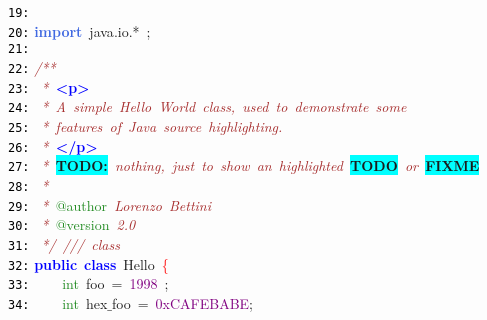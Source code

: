 \documentclass{article}
\begin{document}
\mbox{}\texttt{\textcolor{Black}{19:}}  \\
\mbox{}\texttt{\textcolor{Black}{20:}} \textbf{\textcolor{RoyalBlue}{import}}\ java\textcolor{BrickRed}{.}io\textcolor{BrickRed}{.*}\ \textcolor{BrickRed}{;} \\
\mbox{}\texttt{\textcolor{Black}{21:}}  \\
\mbox{}\texttt{\textcolor{Black}{22:}} \textit{\textcolor{Brown}{/**}} \\
\mbox{}\texttt{\textcolor{Black}{23:}} \textit{\textcolor{Brown}{\ *\ }}\textbf{\textcolor{Blue}{\textless{}p\textgreater{}}} \\
\mbox{}\texttt{\textcolor{Black}{24:}} \textit{\textcolor{Brown}{\ *\ A\ simple\ Hello\ World\ class,\ used\ to\ demonstrate\ some}} \\
\mbox{}\texttt{\textcolor{Black}{25:}} \textit{\textcolor{Brown}{\ *\ features\ of\ Java\ source\ highlighting.}} \\
\mbox{}\texttt{\textcolor{Black}{26:}} \textit{\textcolor{Brown}{\ *\ }}\textbf{\textcolor{Blue}{\textless{}/p\textgreater{}}} \\
\mbox{}\texttt{\textcolor{Black}{27:}} \textit{\textcolor{Brown}{\ *\ }}\textbf{\colorbox{Cyan}{TODO:}}\textit{\textcolor{Brown}{\ nothing,\ just\ to\ show\ an\ highlighted\ }}\textbf{\colorbox{Cyan}{TODO}}\textit{\textcolor{Brown}{\ or\ }}\textbf{\colorbox{Cyan}{FIXME}} \\
\mbox{}\texttt{\textcolor{Black}{28:}} \textit{\textcolor{Brown}{\ *}} \\
\mbox{}\texttt{\textcolor{Black}{29:}} \textit{\textcolor{Brown}{\ *\ }}\textcolor{ForestGreen}{@author}\textit{\textcolor{Brown}{\ Lorenzo\ Bettini}} \\
\mbox{}\texttt{\textcolor{Black}{30:}} \textit{\textcolor{Brown}{\ *\ }}\textcolor{ForestGreen}{@version}\textit{\textcolor{Brown}{\ 2.0}} \\
\mbox{}\texttt{\textcolor{Black}{31:}} \textit{\textcolor{Brown}{\ */}}\ \textit{\textcolor{Brown}{///\ class}} \\
\mbox{}\texttt{\textcolor{Black}{32:}} \textbf{\textcolor{Blue}{public}}\ \textbf{\textcolor{Blue}{class}}\ \textcolor{TealBlue}{Hello}\ \textcolor{Red}{\{} \\
\mbox{}\texttt{\textcolor{Black}{33:}} \ \ \ \ \textcolor{ForestGreen}{int}\ foo\ \textcolor{BrickRed}{=}\ \textcolor{Purple}{1998}\ \textcolor{BrickRed}{;} \\
\mbox{}\texttt{\textcolor{Black}{34:}} \ \ \ \ \textcolor{ForestGreen}{int}\ hex$\_$foo\ \textcolor{BrickRed}{=}\ \textcolor{Purple}{0xCAFEBABE}\textcolor{BrickRed}{;} \\
\end{document}
